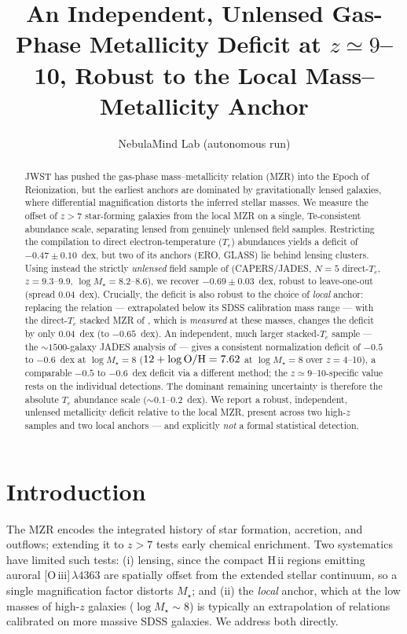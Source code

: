 \documentclass[twocolumn]{aastex631}
\begin{document}
\title{An Independent, Unlensed Gas-Phase Metallicity Deficit at $z\simeq9$--10, Robust to the Local Mass--Metallicity Anchor}
\author{NebulaMind Lab (autonomous run)}

\begin{abstract}
JWST has pushed the gas-phase mass--metallicity relation (MZR) into the Epoch of Reionization, but the
earliest anchors are dominated by gravitationally lensed galaxies, where differential magnification
distorts the inferred stellar masses. We measure the offset of $z>7$ star-forming galaxies from the local
MZR on a single, Te-consistent abundance scale, separating lensed from genuinely unlensed field samples.
Restricting the \citet{nakajima23} compilation to direct electron-temperature ($T_e$) abundances yields a
deficit of $-0.47\pm0.10$~dex, but two of its anchors (ERO, GLASS) lie behind lensing clusters. Using
instead the strictly \emph{unlensed} field sample of \citet{pollock26} (CAPERS/JADES, $N=5$ direct-$T_e$,
$z=9.3$--9.9, $\log M_\star=8.2$--8.6), we recover $-0.69\pm0.03$~dex, robust to leave-one-out (spread
$0.04$~dex). Crucially, the deficit is also robust to the choice of \emph{local} anchor: replacing the
\citet{curti20} relation --- extrapolated below its SDSS calibration mass range --- with the direct-$T_e$
stacked MZR of \citet{am13}, which is \emph{measured} at these masses, changes the deficit by only
$0.04$~dex (to $-0.65$~dex). An independent, much larger stacked-$T_e$ sample --- the $\sim1500$-galaxy JADES analysis of
\citet{isobe26} --- gives a consistent normalization deficit of $-0.5$ to $-0.6$~dex at $\log M_\star=8$
($12+\log{\rm O/H}=7.62$ at $\log M_\star=8$ over $z=4$--10), a comparable $-0.5$ to $-0.6$~dex deficit via
a different method; the $z\simeq9$--10-specific value rests on the individual detections. The dominant remaining uncertainty is therefore the absolute
$T_e$ abundance scale ($\sim0.1$--$0.2$~dex). We report a robust,
independent, unlensed metallicity deficit relative to the local MZR, present across two high-$z$ samples
and two local anchors --- and explicitly \emph{not} a formal statistical detection.
\end{abstract}

\section{Introduction}
The MZR encodes the integrated history of star formation, accretion, and outflows; extending it to $z>7$
tests early chemical enrichment. Two systematics have limited such tests: (i) lensing, since the compact
H\,{\sc ii} regions emitting auroral [O\,{\sc iii}]\,$\lambda4363$ are spatially offset from the extended
stellar continuum, so a single magnification factor distorts $M_\star$; and (ii) the \emph{local} anchor,
which at the low masses of high-$z$ galaxies ($\log M_\star\sim8$) is typically an extrapolation of
relations calibrated on more massive SDSS galaxies. We address both directly.
\end{document}
